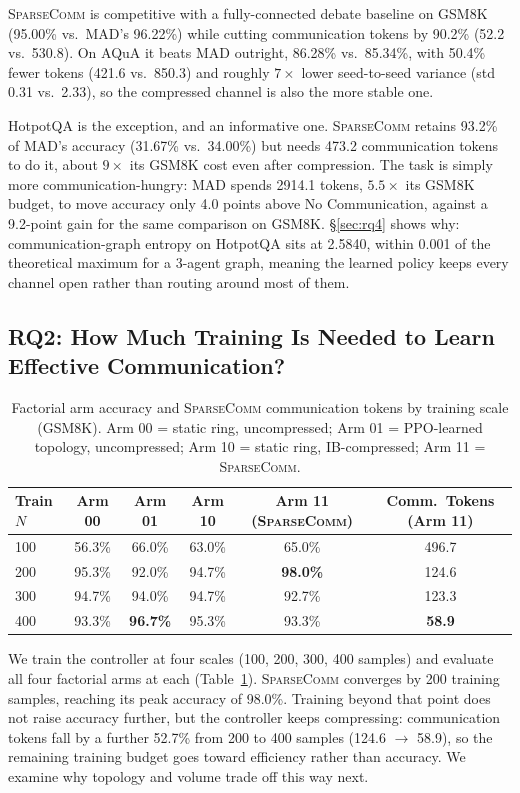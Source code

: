 \documentclass[11pt]{article}
\newcommand{\sys}{\textsc{SparseComm}\xspace}
\begin{document}
\sys is competitive with a fully-connected debate baseline on GSM8K
(95.00\% vs.\ MAD's 96.22\%) while cutting communication tokens by 90.2\%
(52.2 vs.\ 530.8). On AQuA it beats MAD outright, 86.28\% vs.\ 85.34\%, with
50.4\% fewer tokens (421.6 vs.\ 850.3) and roughly $7\times$ lower
seed-to-seed variance (std 0.31 vs.\ 2.33), so the compressed channel is
also the more stable one.

HotpotQA is the exception, and an informative one. \sys retains 93.2\% of
MAD's accuracy (31.67\% vs.\ 34.00\%) but needs 473.2 communication tokens
to do it, about $9\times$ its GSM8K cost even after compression. The task
is simply more communication-hungry: MAD spends 2914.1 tokens, $5.5\times$
its GSM8K budget, to move accuracy only 4.0 points above No Communication,
against a 9.2-point gain for the same comparison on GSM8K. \S\ref{sec:rq4}
shows why: communication-graph entropy on HotpotQA sits at 2.5840, within
0.001 of the theoretical maximum for a 3-agent graph, meaning the learned
policy keeps every channel open rather than routing around most of them.

\subsection{RQ2: How Much Training Is Needed to Learn Effective Communication?}
\label{sec:rq2}

\begin{table}[t]
\centering
\small
\begin{tabular}{lccccc}
\toprule
Train $N$ & Arm 00 & Arm 01 & Arm 10 & \textbf{Arm 11 (\sys)} & Comm.\ Tokens (Arm 11) \\
\midrule
100 & 56.3\% & 66.0\%          & 63.0\% & 65.0\%          & 496.7 \\
200 & 95.3\% & 92.0\%          & 94.7\% & \textbf{98.0\%} & 124.6 \\
300 & 94.7\% & 94.0\%          & 94.7\% & 92.7\%          & 123.3 \\
400 & 93.3\% & \textbf{96.7\%} & 95.3\% & 93.3\%          & \textbf{58.9} \\
\bottomrule
\end{tabular}
\caption{Factorial arm accuracy and \sys communication tokens by training
scale (GSM8K). Arm 00 = static ring,
uncompressed; Arm 01 = PPO-learned topology, uncompressed; Arm 10 = static
ring, IB-compressed; Arm 11 = \sys.}
\label{tab:ablation-scale}
\end{table}

We train the controller at four scales (100, 200, 300, 400 samples) and
evaluate all four factorial arms at each (Table~\ref{tab:ablation-scale}).
\sys converges by 200 training samples, reaching its peak accuracy of
98.0\%. Training beyond that point does not raise accuracy further, but the
controller keeps compressing: communication tokens fall by a further
52.7\% from 200 to 400 samples (124.6 $\to$ 58.9), so the remaining
training budget goes toward efficiency rather than accuracy. We examine why
topology and volume trade off this way next.
\end{document}
